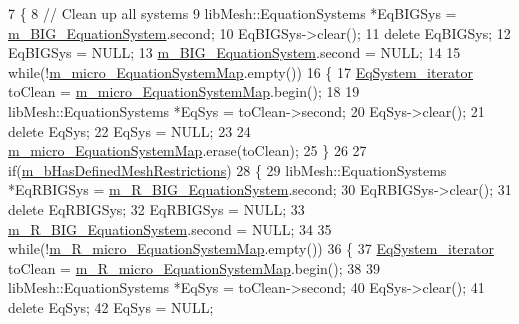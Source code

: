 \begin{DoxyCode}
7     \{
8         \textcolor{comment}{// Clean up all systems}
9         libMesh::EquationSystems *EqBIGSys = \hyperlink{classcarl_1_1assemble__coupling__matrices_a74638b62015299b30afb23168b141429}{m\_BIG\_EquationSystem}.second;
10         EqBIGSys->clear();
11         \textcolor{keyword}{delete} EqBIGSys;
12         EqBIGSys = NULL;
13         \hyperlink{classcarl_1_1assemble__coupling__matrices_a74638b62015299b30afb23168b141429}{m\_BIG\_EquationSystem}.second = NULL;
14 
15         \textcolor{keywordflow}{while}(!\hyperlink{classcarl_1_1assemble__coupling__matrices_a13fddbcb853df9b7ce1a99062fb9f8b6}{m\_micro\_EquationSystemMap}.empty())
16         \{
17             \hyperlink{classcarl_1_1assemble__coupling__matrices_a2c14330f6dd8399037d78458bb27b4f4}{EqSystem\_iterator} toClean = 
      \hyperlink{classcarl_1_1assemble__coupling__matrices_a13fddbcb853df9b7ce1a99062fb9f8b6}{m\_micro\_EquationSystemMap}.begin();
18 
19             libMesh::EquationSystems *EqSys = toClean->second;
20             EqSys->clear();
21             \textcolor{keyword}{delete} EqSys;
22             EqSys = NULL;
23 
24             \hyperlink{classcarl_1_1assemble__coupling__matrices_a13fddbcb853df9b7ce1a99062fb9f8b6}{m\_micro\_EquationSystemMap}.erase(toClean);
25         \}
26 
27         \textcolor{keywordflow}{if}(\hyperlink{classcarl_1_1assemble__coupling__matrices_aaed7135f088376664521b650c2b25fbd}{m\_bHasDefinedMeshRestrictions})
28         \{
29             libMesh::EquationSystems *EqRBIGSys = \hyperlink{classcarl_1_1assemble__coupling__matrices_ac8e2172182aa563e854e7b693344b301}{m\_R\_BIG\_EquationSystem}.second;
30             EqRBIGSys->clear();
31             \textcolor{keyword}{delete} EqRBIGSys;
32             EqRBIGSys = NULL;
33             \hyperlink{classcarl_1_1assemble__coupling__matrices_ac8e2172182aa563e854e7b693344b301}{m\_R\_BIG\_EquationSystem}.second = NULL;
34 
35             \textcolor{keywordflow}{while}(!\hyperlink{classcarl_1_1assemble__coupling__matrices_a5b7c4f9307a9611926dc1ccf8bb33d4b}{m\_R\_micro\_EquationSystemMap}.empty())
36             \{
37                 \hyperlink{classcarl_1_1assemble__coupling__matrices_a2c14330f6dd8399037d78458bb27b4f4}{EqSystem\_iterator} toClean = 
      \hyperlink{classcarl_1_1assemble__coupling__matrices_a5b7c4f9307a9611926dc1ccf8bb33d4b}{m\_R\_micro\_EquationSystemMap}.begin();
38 
39                 libMesh::EquationSystems *EqSys = toClean->second;
40                 EqSys->clear();
41                 \textcolor{keyword}{delete} EqSys;
42                 EqSys = NULL;

\end{DoxyCode}
